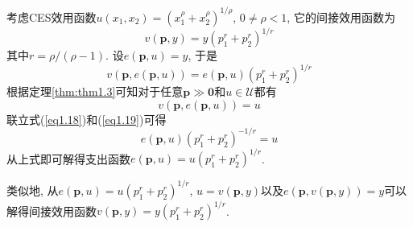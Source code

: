 \documentclass[cn, 12pt, math=mtpro2, bibstyle=apa, blue, twocol]{elegantbook}
\newcommand{\p}{\mathbf{p}}
\begin{document}
\begin{example}
考虑CES效用函数$u(x_1,x_2)=(x_1^\rho+x_2^\rho)^{1/\rho}$, $0\neq\rho<1$, 它的间接效用函数为
$$v(\p,y)=y(p_1^r+p_2^r)^{1/r}$$
其中$r=\rho/(\rho-1)$. 设$e(\p,u)=y$, 于是
\begin{equation}\label{eq1.18}
  v(\p,e(\p,u))=e(\p,u)(p_1^r+p_2^r)^{1/r}
\end{equation}
根据定理\ref{thm:thm1.3}可知对于任意$\p\gg\mathbf{0}$和$u\in\mathcal{U}$都有
\begin{equation}\label{eq1.19}
  v(\p,e(\p,u))=u
\end{equation}
联立式(\ref{eq1.18})和(\ref{eq1.19})可得
$$e(\p,u)(p_1^r+p_2^r)^{-1/r}=u$$
从上式即可解得支出函数$e(\p,u)=u(p_1^r+p_2^r)^{1/r}$.

类似地, 从$e(\p,u)=u(p_1^r+p_2^r)^{1/r}$, $u=v(\p,y)$以及$e(\p,v(\p,y))=y$可以解得间接效用函数$v(\p,y)=y(p_1^r+p_2^r)^{1/r}$.
\end{example}
\end{document}
